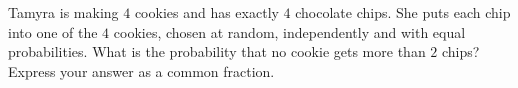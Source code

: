 Tamyra is making $4$ cookies and has exactly $4$ chocolate chips. She puts each chip into one of the $4$ cookies, chosen at random, independently and with equal probabilities. What is the probability that no cookie gets more than $2$ chips? Express your answer as a common fraction.

